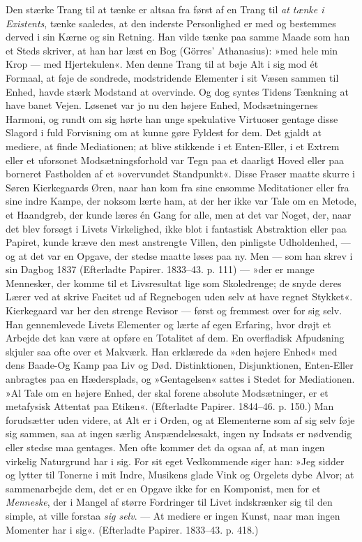 \documentclass[12pt,a4paper,openany]{book}
\newcommand{\opage}[1]{\marginnote{\footnotesize\textit{[#1]}}}
\begin{document}
Den stærke Trang til at tænke er altsaa fra først
af en Trang til \textit{at tænke i Existents}, tænke saaledes, at
den inderste Personlighed er med og bestemmes derved i
sin Kærne og sin Retning. Han vilde tænke paa samme
Maade som han et Steds skriver, at han har læst en Bog
(Görres' Athanasius): »med hele min Krop --- med Hjertekulen«.
Men denne Trang til at bøje Alt i sig mod ét
Formaal, at føje de sondrede, modstridende Elementer i
sit Væsen sammen til Enhed, havde stærk Modstand at
overvinde. Og dog syntes Tidens Tænkning at have
banet Vejen. Løsenet var jo nu den højere Enhed, Modsætningernes
Harmoni, og rundt om sig hørte han unge
spekulative Virtuoser gentage disse Slagord i fuld Forvisning
om at kunne gøre Fyldest for dem. Det gjaldt
at mediere, at finde Mediationen; at blive stikkende i et
Enten-Eller, i et Extrem eller et uforsonet Modsætningsforhold
var Tegn paa et daarligt Hoved eller paa borneret
Fastholden af et »overvundet Standpunkt«. Disse
Fraser maatte skurre i Søren Kierkegaards Øren, naar
han kom fra sine ensomme Meditationer eller fra sine
indre Kampe, der noksom lærte ham, at der her ikke
var Tale om en Metode, et Haandgreb, der kunde læres
én Gang for alle, men at det var Noget, der, naar det
blev forsøgt i Livets Virkelighed, ikke blot i fantastisk
\opage{46}Abstraktion eller paa Papiret, kunde kræve den mest
anstrengte Villen, den pinligste Udholdenhed, --- og at
det var en Opgave, der stedse maatte løses paa ny.
Men --- som han skrev i sin Dagbog 1837 (Efterladte
Papirer. 1833--43. p. 111) --- »der er mange Mennesker,
der komme til et Livsresultat lige som Skoledrenge;
de snyde deres Lærer ved at skrive Facitet ud af Regnebogen
uden selv at have regnet Stykket«. Kierkegaard
var her den strenge Revisor --- først og fremmest over
for sig selv. Han gennemlevede Livets Elementer og
lærte af egen Erfaring, hvor drøjt et Arbejde det kan
være at opføre en Totalitet af dem. En overfladisk Afpudsning
skjuler saa ofte over et Makværk. Han erklærede
da »den højere Enhed« med dens Baade-Og Kamp
paa Liv og Død. Distinktionen, Disjunktionen, Enten-Eller
anbragtes paa en Hædersplads, og »Gentagelsen«
sattes i Stedet for Mediationen. »Al Tale om en højere
Enhed, der skal forene absolute Modsætninger, er et
metafysisk Attentat paa Etiken«. (Efterladte Papirer.
1844--46. p. 150.) Man forudsætter uden videre, at
Alt er i Orden, og at Elementerne som af sig selv føje
sig sammen, saa at ingen særlig Anspændelsesakt, ingen
ny Indsats er nødvendig eller stedse maa gentages. Men
ofte kommer det da ogsaa af, at man ingen virkelig
Naturgrund har i sig. For sit eget Vedkommende siger
han: »Jeg sidder og lytter til Tonerne i mit Indre,
Musikens glade Vink og Orgelets dybe Alvor; at sammenarbejde
dem, det er en Opgave ikke for en Komponist,
men for et \textit{Menneske}, der i Mangel af større Fordringer
til Livet indskrænker sig til den simple, at ville
forstaa \textit{sig selv}. --- At mediere er ingen Kunst, naar
man ingen Momenter har i sig«. (Efterladte Papirer. 1833--43.
p. 418.)
\end{document}
